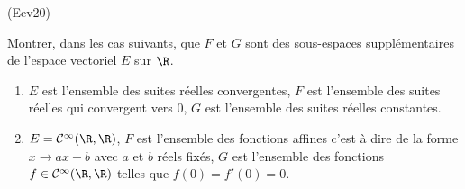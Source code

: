 \begin{tiny}(Eev20)\end{tiny} Montrer, dans les cas suivants, que $F$ et $G$ sont des sous-espaces supplémentaires de l'espace vectoriel $E$ sur $\R$.
\begin{enumerate}
 \item $E$ est l'ensemble des suites réelles convergentes, $F$ est l'ensemble des suites réelles qui convergent vers $0$, $G$ est l'ensemble des suites réelles constantes.
 \item $E=\mathcal{C}^{\infty}(\R,\R)$, $F$ est l'ensemble des fonctions affines c'est à dire de la forme $x\rightarrow ax+b$ avec $a$ et $b$ réels fixés, $G$ est l'ensemble des fonctions $f\in \mathcal{C}^{\infty}(\R,\R)$ telles que $f(0)=f'(0)=0$. 
\end{enumerate}
 